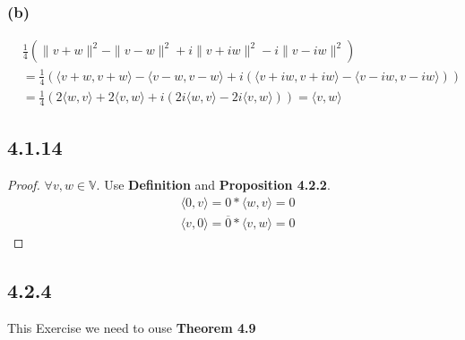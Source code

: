\documentclass{article}
\newtheorem*{proof}{Proof}
\begin{document}
\subsubsection*{(b)}
\begin{equation*}
    \begin{split}
        &\frac 1 4 (\|v + w\|^2 - \|v - w\|^2 + i\|v + iw\|^2 - i\|v-iw\|^2) \\
        &= \frac 1 4 (\langle v+w, v+w\rangle - \langle v-w, v-w \rangle + i(\langle v+ iw, v+ iw\rangle - \langle v- iw, v- iw \rangle)) \\
        &= \frac 1 4(2 \langle w , v\rangle +2 \langle v, w \rangle + i(2i \langle w , v\rangle - 2i \langle v, w \rangle)) = \langle v, w \rangle
    \end{split}
\end{equation*}

\subsection*{4.1.14}
\begin{proof}
    $\forall v, w \in \mathbb{V}$. Use \textbf{Definition} and \textbf{Proposition 4.2.2}.
    \begin{equation*}
        \begin{split}
            & \langle 0, v \rangle = 0 * \langle w, v \rangle = 0 \\
            & \langle v, 0 \rangle = \overline 0 * \langle v, w \rangle = 0
        \end{split}
    \end{equation*}
\end{proof}

\subsection*{4.2.4}
\noindent This Exercise we need to ouse \textbf{Theorem 4.9} 
\end{document}
